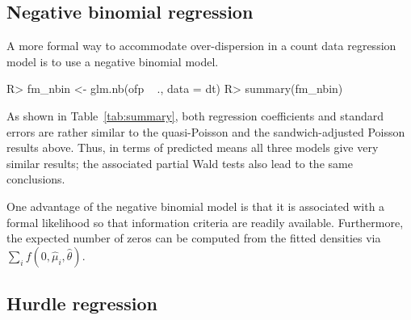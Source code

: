 \documentclass{Z}
\begin{document}
\subsection{Negative binomial regression}

A more formal way to accommodate over-dispersion in a count data regression
model is to use a negative binomial model.
\begin{Schunk}
\begin{Sinput}
R> fm_nbin <- glm.nb(ofp ~ ., data = dt)
R> summary(fm_nbin)
\end{Sinput}
\end{Schunk}
As shown in Table~\ref{tab:summary},
both regression coefficients and standard errors are rather similar
to the quasi-Poisson and the sandwich-adjusted Poisson results above. Thus,
in terms of predicted means all three models give very similar results;
the associated partial Wald tests also lead to the same conclusions.

One advantage of the negative binomial model is that it is associated with a formal
likelihood so that information criteria are readily available. Furthermore, the expected
number of zeros can be computed from the fitted densities via 
$\sum_i f(0, \hat \mu_i, \hat \theta)$. 


\subsection{Hurdle regression}
\end{document}
